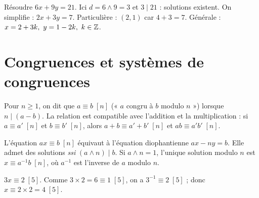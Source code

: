 \begin{illus}
\end{illus}

\begin{exemple}
Résoudre $6x+9y=21$. Ici $d=6\wedge9=3$ et $3\mid21$ : solutions existent. On simplifie :
$2x+3y=7$. Particulière : $(2,1)$ car $4+3=7$. Générale : $x=2+3k,\ y=1-2k,\ k\in\Z$.
\end{exemple}

\section{Congruences et systèmes de congruences}

\begin{definition}[Congruence]
Pour $n\ge1$, on dit que $a\equiv b\;[n]$ (« $a$ congru à $b$ modulo $n$ ») lorsque
$n\mid(a-b)$. La relation est compatible avec l'addition et la multiplication :
si $a\equiv a'\;[n]$ et $b\equiv b'\;[n]$, alors $a+b\equiv a'+b'\;[n]$ et
$ab\equiv a'b'\;[n]$.
\end{definition}

\begin{theoreme}
L'équation $ax\equiv b\;[n]$ équivaut à l'équation diophantienne $ax-ny=b$. Elle admet des
solutions \emph{ssi} $(a\wedge n)\mid b$. Si $a\wedge n=1$, l'unique solution modulo $n$ est
$x\equiv a^{-1}b\;[n]$, où $a^{-1}$ est l'inverse de $a$ modulo $n$.
\end{theoreme}

\begin{exemple}
$3x\equiv2\;[5]$. Comme $3\times2=6\equiv1\;[5]$, on a $3^{-1}\equiv2\;[5]$ ; donc
$x\equiv2\times2=4\;[5]$.
\end{exemple}

